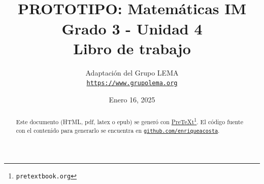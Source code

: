 
\title{PROTOTIPO: Matemáticas IM\textsuperscript{\textregistered}\\
{\large Grado 3 - Unidad 4}\\[1ex]{\Huge Libro de trabajo}}
\author{Adaptación del Grupo LEMA\\
\href{https://www.grupolema.org}{\nolinkurl{https://www.grupolema.org}}
}
\date{Enero 16, 2025}

\raggedbottom
\label{gra3-uni4}\hypertarget{gra3-uni4}{}
\maketitle
\thispagestyle{empty}
\renewcommand*{\abstractname}{}
\begin{abstract}
Este documento (HTML, pdf, latex o epub) se generó con \href{https://pretextbook.org}{PreTeXt}\footnote{\nolinkurl{pretextbook.org}\label{meta-source-2-2}}. El código fuente con el contenido para generarlo se encuentra en \href{https://github.com/enriqueacosta/IllustrativeMath-GrupoLEMA}{\nolinkurl{github.com/enriqueacosta}}.%
\end{abstract}
\clearpage
\renewcommand*{\abstractname}{Licencia}
